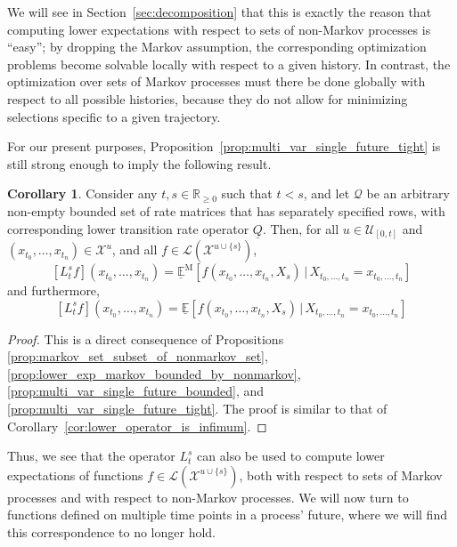 \documentclass[10pt]{paper}
\theoremstyle{definition}
\newtheorem{proposition}[theorem]{Proposition}
\newtheorem{corollary}[theorem]{Corollary}
\newcommand{\reals}{\mathbb{R}}
\newcommand{\realspos}{\reals_{>0}}
\newcommand{\realsnonneg}{\reals_{\geq 0}}
\newcommand{\states}{\mathcal{X}}
\newcommand{\processes}{\mathbb{P}}
\newcommand{\mprocesses}{\processes^{\mathrm{M}}}
\newcommand{\gambles}{\mathcal{L}}
\newcommand{\rateset}{\mathcal{Q}}
\newcommand{\lrate}{\underline{Q}}
\newcommand{\norm}[1]{\left\lVert #1 \right\rVert}
\begin{document}
We will see in Section~\ref{sec:decomposition} that this is exactly the reason that computing lower expectations with respect to sets of non-Markov processes is ``easy''; by dropping the Markov assumption, the corresponding optimization problems become solvable locally with respect to a given history. In contrast, the optimization over sets of Markov processes must there be done globally with respect to all possible histories, because they do not allow for minimizing selections specific to a given trajectory.

For our present purposes, Proposition~\ref{prop:multi_var_single_future_tight} is still strong enough to imply the following result.


\begin{corollary}
Consider any $t,s\in\realsnonneg$ such that $t<s$, and let $\rateset$ be an arbitrary non-empty bounded set of rate matrices that has separately specified rows, with corresponding lower transition rate operator $\lrate$. Then, for all $u\in\mathcal{U}_{[0,t]}$ and $(x_{t_0},\ldots,x_{t_n})\in\states^u$, and all $f\in\gambles(\states^{u\cup\{s\}})$,
\begin{equation*}
\left[L_t^s f\right](x_{t_0},\ldots,x_{t_n}) = \underline{\mathbb{E}}^{\mathrm{M}}[f(x_{t_0},\ldots,x_{t_n},X_s)\,\vert\,X_{t_0,\ldots,t_n}=x_{t_0,\ldots,t_n}]
\end{equation*}
and furthermore,
\begin{equation*}
\left[L_t^s f\right](x_{t_0},\ldots,x_{t_n}) = \underline{\mathbb{E}}[f(x_{t_0},\ldots,x_{t_n},X_s)\,\vert\,X_{t_0,\ldots,t_n}=x_{t_0,\ldots,t_n}]
\end{equation*}
\end{corollary}
\begin{proof}
This is a direct consequence of Propositions \ref{prop:markov_set_subset_of_nonmarkov_set}, \ref{prop:lower_exp_markov_bounded_by_nonmarkov}, \ref{prop:multi_var_single_future_bounded}, and \ref{prop:multi_var_single_future_tight}. The proof is similar to that of Corollary~\ref{cor:lower_operator_is_infimum}.
\end{proof}
Thus, we see that the operator $L_t^s$ can also be used to compute lower expectations of functions $f\in\gambles(\states^{u\cup\{s\}})$, both with respect to sets of Markov processes and with respect to non-Markov processes. We will now turn to functions defined on multiple time points in a process' future, where we will find this correspondence to no longer hold.
\end{document}
